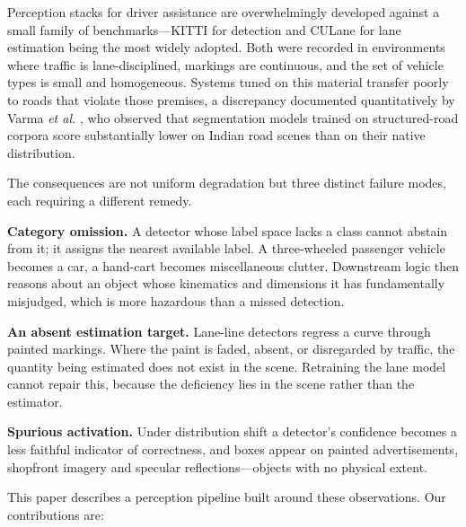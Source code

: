 \documentclass[conference]{IEEEtran}
\begin{document}
Perception stacks for driver assistance are overwhelmingly developed against a
small family of benchmarks---KITTI \cite{geiger2012kitti} for detection and
CULane \cite{pan2018scnn} for lane estimation being the most widely adopted.
Both were recorded in environments where traffic is lane-disciplined, markings
are continuous, and the set of vehicle types is small and homogeneous. Systems
tuned on this material transfer poorly to roads that violate those premises, a
discrepancy documented quantitatively by Varma \textit{et al.}
\cite{varma2019idd}, who observed that segmentation models trained on
structured-road corpora score substantially lower on Indian road scenes than on
their native distribution.

The consequences are not uniform degradation but three distinct failure modes,
each requiring a different remedy.

\textbf{Category omission.} A detector whose label space lacks a class cannot
abstain from it; it assigns the nearest available label. A three-wheeled
passenger vehicle becomes a car, a hand-cart becomes miscellaneous clutter.
Downstream logic then reasons about an object whose kinematics and dimensions it
has fundamentally misjudged, which is more hazardous than a missed detection.

\textbf{An absent estimation target.} Lane-line detectors regress a curve through
painted markings. Where the paint is faded, absent, or disregarded by traffic,
the quantity being estimated does not exist in the scene. Retraining the lane
model cannot repair this, because the deficiency lies in the scene rather than
the estimator.

\textbf{Spurious activation.} Under distribution shift a detector's confidence
becomes a less faithful indicator of correctness, and boxes appear on painted
advertisements, shopfront imagery and specular reflections---objects with no
physical extent.

This paper describes a perception pipeline built around these observations. Our
contributions are:
\end{document}
